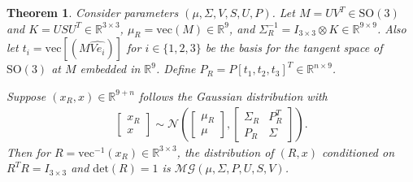 \documentclass[10pt,twocolumn]{article}
\newtheorem{theorem}{Theorem}
\newcommand{\SO}{\ensuremath{\mathrm{SO(3)}}}
\newcommand{\real}[1]{\ensuremath{\mathbb{R}^{ #1 }}}
\begin{document}
\begin{theorem}
	Consider parameters $(\mu, \Sigma, V, S, U, P)$.
	Let $M = UV^T\in\SO$ and $K = USU^T\in\real{3\times 3}$, ${\mu}_R = \mathrm{vec}(M)\in\real{9}$, and ${\Sigma}_R^{-1} = I_{3\times 3} \otimes K \in\real{9\times 9}$.
	Also let ${t}_i = \mathrm{vec}[(M\widehat{Ve_{i}})]$ for $i\in\{1,2,3\}$ be the basis for the tangent space of $\SO$ at $M$  embedded in $\real{9}$.
	Define $P_R = P[t_1,t_2,t_3]^T\in\real{n\times 9}$. 
	
	Suppose $(x_R,x)\in\real{9+n}$ follows the Gaussian distribution with 
	\begin{align}
		\begin{bmatrix} x_R \\ x \end{bmatrix} 
		\sim \mathcal{N} \left(
		\begin{bmatrix} \mu_R \\ \mu \end{bmatrix},
		\begin{bmatrix}
		\Sigma_R & P_R^T \\
		P_R & \Sigma
		\end{bmatrix} \right).\label{eqn:xRx_Gaussian}
	\end{align}
	Then for $R=\mathrm{vec}^{-1}(x_R)\in\real{3\times 3}$, the distribution of $(R,x)$ conditioned on $R^TR = I_{3\times3}$ and $\mathrm{det}(R)=1$ is $\mathcal{MG}({\mu},{\Sigma},{P},U,S,V)$.
\end{theorem}
\end{document}
